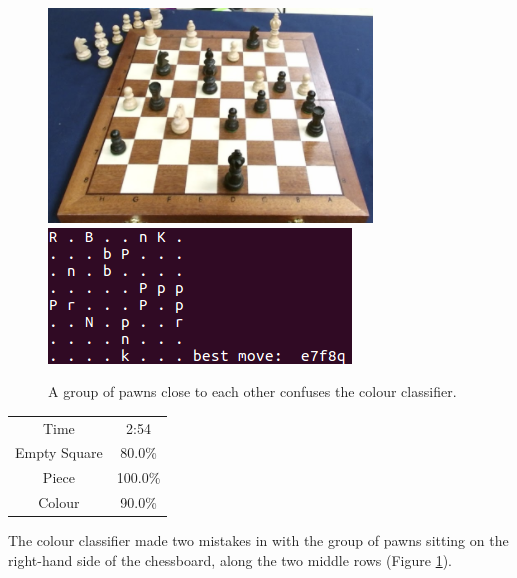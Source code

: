 \documentclass{l4proj}
\begin{document}
  
\pagebreak
\begin{figure}[h!]
\includegraphics[scale=0.8]{ts/ts9.png} \includegraphics[scale=0.75]{ts/tsd9.png}
\caption{A group of pawns close to each other confuses the colour classifier.}
\label{ts9}
\end{figure}
\vspace{5mm}

\begin{table}[h!]
\centering
\begin{tabular}{|c|c|}
	\hline
	Time & 2:54 \\
	\rowcolor{brown!45}Empty Square & 80.0\%  \\
	Piece & 100.0\% \\
	\rowcolor{brown!45} Colour & 90.0\% \\
	\hline
\end{tabular}
\end{table}

The colour classifier made two mistakes in with the group of pawns sitting on the right-hand side of the chessboard, along the two middle rows (Figure \ref{ts9}).
\end{document}
